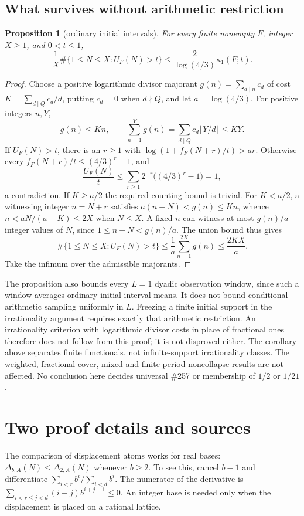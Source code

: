 \documentclass[11pt]{article}
\theoremstyle{plain}
\newtheorem{prop}[thm]{Proposition}
\theoremstyle{definition}
\theoremstyle{remark}
\begin{document}
\subsection{What survives without arithmetic restriction}
\begin{prop}[ordinary initial intervals]\label{prop:257-logarithmic-initial-interval}
For every finite nonempty $F$, integer $X\ge1$, and $0<t\le1$,
\[
 \frac1X\#\{1\le N\le X:U_F(N)>t\}
 \le\frac{2}{\log(4/3)}\kappa_1(F;t).
\]
\end{prop}
\begin{proof}
Choose a positive logarithmic divisor majorant
$g(n)=\sum_{d\mid n}c_d$ of cost $K=\sum_{d\mid Q}c_d/d$, putting
$c_d=0$ when $d\nmid Q$, and let $a=\log(4/3)$.
For positive integers $n,Y$,
\[
 g(n)\le Kn,\qquad
 \sum_{n=1}^{Y}g(n)=\sum_{d\mid Q}c_d\lfloor Y/d\rfloor\le KY.
\]
If $U_F(N)>t$, there is an $r\ge1$ with
$\log(1+f_F(N+r)/t)>ar$.
Otherwise every $f_F(N+r)/t\le(4/3)^r-1$, and
\[
 \frac{U_F(N)}t\le\sum_{r\ge1}2^{-r}\bigl((4/3)^r-1\bigr)=1,
\]
a contradiction.
If $K\ge a/2$ the required counting bound is trivial.
For $K<a/2$, a witnessing integer $n=N+r$ satisfies
$a(n-N)<g(n)\le Kn$, whence $n<aN/(a-K)\le2X$ when $N\le X$.
A fixed $n$ can witness at most $g(n)/a$ integer values of
$N$, since $1\le n-N<g(n)/a$.
The union bound thus gives
\[
 \#\{1\le N\le X:U_F(N)>t\}
 \le\frac1a\sum_{n=1}^{2X}g(n)\le\frac{2KX}{a}.
\]
Take the infimum over the admissible majorants.
\end{proof}

The proposition also bounds every $L=1$ dyadic observation window, since
such a window averages ordinary initial-interval means.  It does not bound
conditional arithmetic sampling uniformly in $L$.  Freezing a finite
initial support in the irrationality argument requires exactly that
arithmetic restriction.  An irrationality criterion with logarithmic
divisor costs in place of fractional ones therefore does not follow from
this proof; it is not disproved either.
The corollary above separates finite functionals, not infinite-support
irrationality classes.  The weighted, fractional-cover, mixed and
finite-period noncollapse results are not affected.  No conclusion here
decides universal \#257 or membership of $1/2$ or $1/21$.

\clearpage
\section*{Two proof details and sources}
The comparison of displacement atoms works for real bases:
$\Delta_{b,A}(N)\le\Delta_{2,A}(N)$ whenever $b\ge2$.
To see this, cancel $b-1$ and differentiate
$\sum_{i<r}b^i/\sum_{i<d}b^i$. The numerator of the derivative is
$\sum_{i<r\le j<d}(i-j)b^{i+j-1}\le0$.
An integer base is needed only when the displacement is placed on a
rational lattice.
\end{document}
